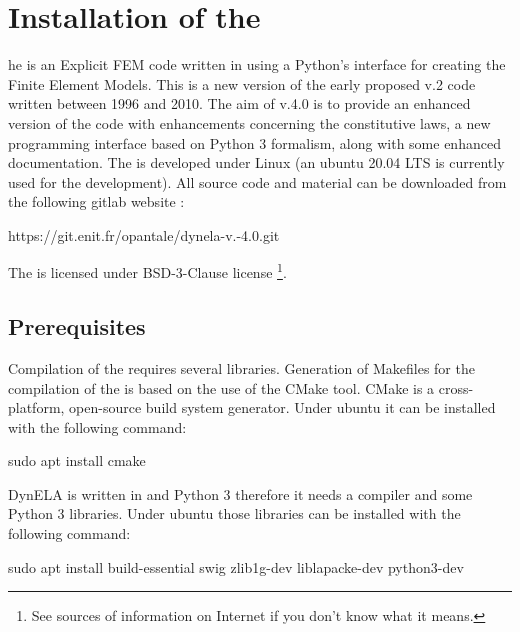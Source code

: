 %
%
%
\chapter{Installation of the \DynELA}\label{Chapter!Installation}

\startcontents[chapters]
\printmyminitoc[2]he \DynELA is an Explicit FEM code written in \Cpp using a Python's interface for creating the Finite Element Models. This is a new version of the early proposed v.2 code written between 1996 and 2010. The aim of v.4.0 is to provide an enhanced version of the code with enhancements concerning the constitutive laws, a new programming interface based on Python 3 formalism, along with some enhanced documentation.
The \DynELA is developed under Linux (an ubuntu 20.04 LTS is currently used for the development). All source code and material can be downloaded from the following gitlab
 website
:

\hspace*{1cm}\textsf{https://git.enit.fr/opantale/dynela-v.-4.0.git}

The \DynELA is licensed under BSD-3-Clause license \footnote{See sources of information on Internet if you don't know what it means.}.

\section{Prerequisites}

Compilation of the \DynELA requires several libraries.
Generation of Makefiles for the compilation of the \DynELA is based on the use of the CMake tool. CMake is a cross-platform, open-source build system generator. Under ubuntu it can be installed with the following command:

\begin{BashListing}[numbers=none]
sudo apt install cmake
\end{BashListing}

DynELA is written in \Cpp and Python 3 therefore it needs a \Cpp compiler and some Python 3 libraries. Under ubuntu those libraries can be installed with the following command:

\begin{BashListing}[numbers=none]
sudo apt install build-essential swig zlib1g-dev liblapacke-dev python3-dev
\end{BashListing}

